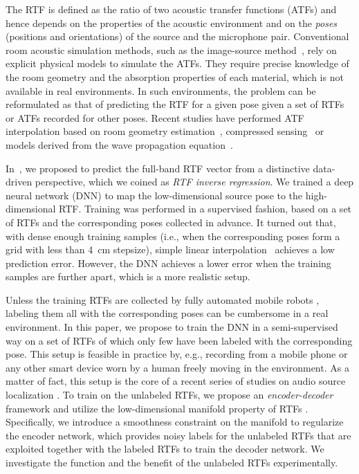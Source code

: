 \documentclass{article}
\begin{document}
The RTF is defined as the ratio of two acoustic transfer functions (ATFs) and hence depends on the properties of the acoustic environment and on the \emph{poses} (positions and orientations) of the source and the microphone pair. Conventional room acoustic simulation methods, such as the image-source method~\cite{allen1979image}, rely on explicit physical models to simulate the ATFs. They require precise knowledge of the room geometry and the absorption properties of each material, which is not available in real environments. In such environments, the problem can be reformulated as that of predicting the RTF for a given pose given a set of RTFs or ATFs recorded for other poses. Recent studies have performed ATF interpolation based on room geometry estimation~\cite{asaei2014structured}, compressed sensing~\cite{mignot2013room,mignot2014low} or models derived from the wave propagation equation~\cite{samarasinghe2015efficient}.

In~\cite{rtfinv2017}, we proposed to predict the full-band RTF vector from a distinctive data-driven perspective, which we coined as \emph{RTF inverse regression}. We trained a deep neural network (DNN) to map the low-dimensional source pose to the high-dimensional RTF. Training was performed in a supervised fashion, based on a set of RTFs and the corresponding poses collected in advance. It turned out that, with dense enough training samples (i.e., when the corresponding poses form a grid with less than 4~cm stepsize), simple linear interpolation~\cite{vincent2013second} achieves a low prediction error. However, the DNN achieves a lower error when the training samples are further apart, which is a more realistic setup.

Unless the training RTFs are collected by fully automated mobile robots \cite{leroux2015micbots}, labeling them all with the corresponding poses can be cumbersome in a real environment. In this paper, we propose to train the DNN in a semi-supervised way on a set of RTFs of which only few have been labeled with the corresponding pose. This setup is feasible in practice by, e.g., recording from a mobile phone or any other smart device worn by a human freely moving in the environment. As a matter of fact, this setup is the core of a recent series of studies on audio source localization \cite{laufer2016mr}. To train on the unlabeled RTFs, we propose an \emph{encoder-decoder} framework and utilize the low-dimensional manifold property of RTFs \cite{deleforge20122d,laufer2013relative,deleforge2015acoustic}. Specifically, we introduce a smoothness constraint on the manifold to regularize the encoder network, which provides noisy labels for the unlabeled RTFs that are exploited together with the labeled RTFs to train the decoder network. We investigate the function and the benefit of the unlabeled RTFs experimentally. %
\end{document}
